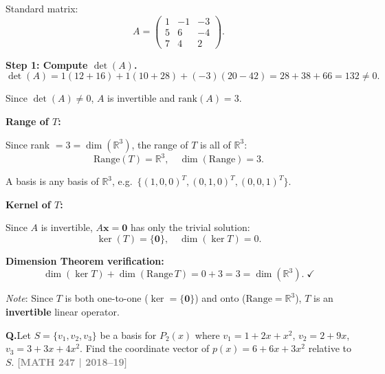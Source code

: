 \documentclass[12pt,a3paper]{article}
\newcommand{\yr}[1]{\hfill\textcolor{gray}{\small\textbf{[#1]}}}
\newcounter{qnum}
\newcommand{\Q}[1]{%
  \needspace{4\baselineskip}
  \refstepcounter{qnum}
  \vspace{6pt}
  \noindent\textbf{Q\theqnum.}\enspace #1\par
}
\begin{document}
\begin{tcolorbox}[enhanced,breakable,
  colback=cF!4,colframe=cF,boxrule=0.8pt,arc=5pt,
  title={\textbf{Answer --- $T(x,y,z)=(x-y-3z,\;5x+6y-4z,\;7x+4y+2z)$: Range, Kernel, Dimension Theorem}},
  fonttitle=\bfseries\color{white},colbacktitle=cF]

Standard matrix:
\[
A=\begin{pmatrix}1&-1&-3\\5&6&-4\\7&4&2\end{pmatrix}.
\]

\textbf{Step 1: Compute $\det(A)$.}
\[
\det(A)=1(12+16)+1(10+28)+(-3)(20-42)=28+38+66=132\neq0.
\]

Since $\det(A)\neq0$, $A$ is invertible and $\mathrm{rank}(A)=3$.

\textbf{Range of $T$:}

Since rank $=3=\dim(\mathbb{R}^3)$, the range of $T$ is all of $\mathbb{R}^3$:
\[
\boxed{\mathrm{Range}(T)=\mathbb{R}^3,\quad\dim(\mathrm{Range})=3.}
\]

A basis is any basis of $\mathbb{R}^3$, e.g.\ $\{(1,0,0)^T,(0,1,0)^T,(0,0,1)^T\}$.

\textbf{Kernel of $T$:}

Since $A$ is invertible, $A\mathbf{x}=\mathbf{0}$ has only the trivial solution:
\[
\boxed{\ker(T)=\{\mathbf{0}\},\quad\dim(\ker T)=0.}
\]

\textbf{Dimension Theorem verification:}
\[
\dim(\ker T)+\dim(\mathrm{Range}\,T)=0+3=3=\dim(\mathbb{R}^3).\;\checkmark
\]

\textit{Note}: Since $T$ is both one-to-one ($\ker=\{\mathbf{0}\}$) and onto ($\mathrm{Range}=\mathbb{R}^3$), $T$ is an \textbf{invertible} linear operator.

\end{tcolorbox}

\Q{Let $S = \{v_1, v_2, v_3\}$ be a basis for $P_2(x)$ where $v_1 = 1 + 2x + x^2$, $v_2 = 2 + 9x$, $v_3 = 3 + 3x + 4x^2$. Find the coordinate vector of $p(x) = 6 + 6x + 3x^2$ relative to $S$.
\yr{MATH 247 | 2018--19}}
\end{document}
